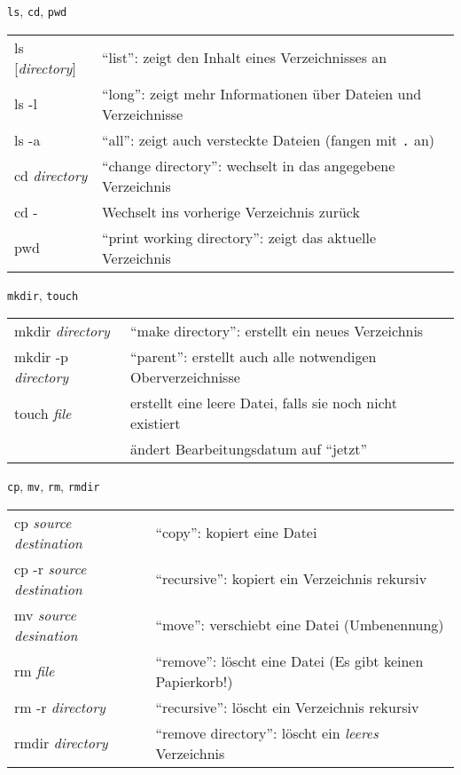 \begin{frame}{\texttt{ls}, \texttt{cd}, \texttt{pwd}}
  \begin{tabu}{>{\ttfamily}l X[,L]}
    ls [\textit{directory}] & \enquote{list}: zeigt den Inhalt eines Verzeichnisses an \\
    ls -l                   & \enquote{long}: zeigt mehr Informationen über Dateien und Verzeichnisse \\
    ls -a                   & \enquote{all}: zeigt auch versteckte Dateien (fangen mit \texttt{.} an) \\
    cd \textit{directory} & \enquote{change directory}: wechselt in das angegebene Verzeichnis\\
    cd - & Wechselt ins vorherige Verzeichnis zurück \\
    pwd                   & \enquote{print working directory}: zeigt das aktuelle Verzeichnis \\
  \end{tabu}
\end{frame}

\begin{frame}{\texttt{mkdir}, \texttt{touch}}
  \begin{tabu}{>{\ttfamily}l X[,L]}
    mkdir \textit{directory}    & \enquote{make directory}: erstellt ein neues Verzeichnis \\
    mkdir -p \textit{directory} & \enquote{parent}: erstellt auch alle notwendigen Oberverzeichnisse \\
    touch \textit{file}         & erstellt eine leere Datei, falls sie noch nicht existiert \\
                                & ändert Bearbeitungsdatum auf \enquote{jetzt}
  \end{tabu}
\end{frame}

\begin{frame}{\texttt{cp}, \texttt{mv}, \texttt{rm}, \texttt{rmdir}}
  \begin{tabu}{>{\ttfamily}l X[,L]}
    cp \textit{source} \textit{destination}    & \enquote{copy}: kopiert eine Datei \\
    cp -r \textit{source} \textit{destination} & \enquote{recursive}: kopiert ein Verzeichnis rekursiv \\
    mv \textit{source} \textit{desination}     & \enquote{move}: verschiebt eine Datei (Umbenennung) \\
    rm \textit{file}                           & \enquote{remove}: löscht eine Datei (Es gibt keinen Papierkorb!) \\
    rm -r \textit{directory}                   & \enquote{recursive}: löscht ein Verzeichnis rekursiv \\
    rmdir \textit{directory}                   & \enquote{remove directory}: löscht ein \emph{leeres} Verzeichnis
  \end{tabu}
\end{frame}


